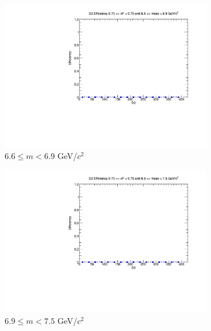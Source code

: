 \documentclass[11pt]{article}
\begin{document}
\begin{figure}[p]
\begin{subfigure}[b]{0.32\textwidth}
        \includegraphics[width=\textwidth]{./kTrackerEfficiencyPlots/D2_Efficiency_xF14_mass8.pdf}
        \caption{$6.6 \leq m < 6.9$ GeV/$c^2$}
    \end{subfigure}\vspace{0.5cm}
    \begin{subfigure}[b]{0.32\textwidth}
        \centering
        \includegraphics[width=\textwidth]{./kTrackerEfficiencyPlots/D2_Efficiency_xF14_mass9.pdf}
        \caption{$6.9 \leq m < 7.5$ GeV/$c^2$}
    \end{subfigure}\hfill
    \begin{subfigure}[b]{0.32\textwidth}
        \centering

\end{subfigure}
\end{figure}
\end{document}
